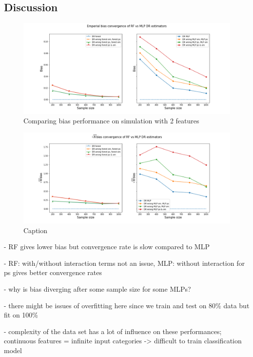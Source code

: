 \documentclass[12pt,twoside]{article}
\begin{document}
\subsection{Discussion}
\begin{figure}[h!]
    \centering
    \includegraphics[width = 0.8\columnwidth]{figures/biascompare.png}
    \caption{Comparing bias performance on simulation with 2 features}
    \label{fig:my_label}
\end{figure}

\begin{figure}[h!]
    \centering
    \includegraphics[width = 0.8\columnwidth]{figures/sqrtncompare.png}
    \caption{Caption}
    \label{fig:my_label}
\end{figure}


- RF gives lower bias but convergence rate is slow compared to MLP 

- RF: with/without interaction terms not an issue, MLP: without interaction for ps gives better convergence rates 

- why is bias diverging after some sample size for some MLPs?

- there might be issues of overfitting here since we train and test on 80\% data but fit on 100\%

- complexity of the data set has a lot of influence on these performances; continuous features = infinite input categories -> difficult to train classification model 
\end{document}
